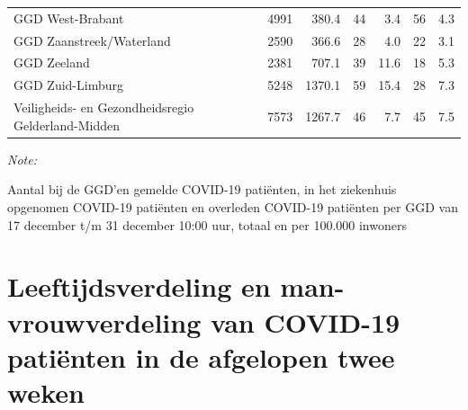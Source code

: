 \documentclass[
  english,
  man,floatsintext]{apa6}
\begin{document}
\begin{table}[H]
\begin{threeparttable}
\begin{tabular}{lrrrrrr}
GGD West-Brabant & 4991 & 380.4 & 44 & 3.4 & 56 & 4.3\\
GGD Zaanstreek/Waterland & 2590 & 366.6 & 28 & 4.0 & 22 & 3.1\\
GGD Zeeland & 2381 & 707.1 & 39 & 11.6 & 18 & 5.3\\
GGD Zuid-Limburg & 5248 & 1370.1 & 59 & 15.4 & 28 & 7.3\\
Veiligheids- en Gezondheidsregio Gelderland-Midden & 7573 & 1267.7 & 46 & 7.7 & 45 & 7.5\\
\bottomrule
\end{tabular}
\begin{tablenotes}
\item \textit{Note: } 
\item Aantal bij de GGD’en gemelde COVID-19 patiënten, in het ziekenhuis opgenomen COVID-19 patiënten en overleden COVID-19 patiënten per GGD van 17 december t/m 31 december 10:00 uur, totaal en per 100.000 inwoners
\end{tablenotes}
\end{threeparttable}
\endgroup{}
\end{table}

\newpage

\hypertarget{leeftijdsverdeling-en-man-vrouwverdeling-van-covid-19-patiuxebnten-in-de-afgelopen-twee-weken}{%
\section{Leeftijdsverdeling en man-vrouwverdeling van COVID-19 patiënten in de afgelopen twee weken}\label{leeftijdsverdeling-en-man-vrouwverdeling-van-covid-19-patiuxebnten-in-de-afgelopen-twee-weken}}
\end{document}
